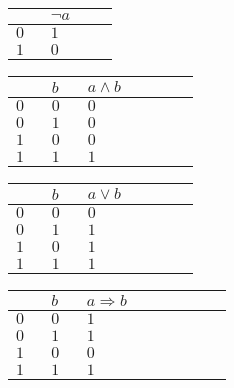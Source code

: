 \documentclass[12pt]{article}
\begin{document}
	\begin{center}
	\begin{longtable}{|>{\centering\arraybackslash}p{0.2333\linewidth}|>{\centering\arraybackslash}p{0.4666\linewidth}|}
		\hline
		{\small $a$} & {\small $\neg a$}\\ 
		\hline
		$0$ & $1$\\ 
		\hline
		$1$ & $0$\\ 
		\hline
	\end{longtable}\end{center}
	\begin{center}
	\begin{longtable}{|>{\centering\arraybackslash}p{0.1399\linewidth}|>{\centering\arraybackslash}p{0.1399\linewidth}|>{\centering\arraybackslash}p{0.4199\linewidth}|}
		\hline
		{\small $a$} & {\small $b$} & {\small $a\wedge b$}\\ 
		\hline
		$0$ & $0$ & $0$\\ 
		\hline
		$0$ & $1$ & $0$\\ 
		\hline
		$1$ & $0$ & $0$\\ 
		\hline
		$1$ & $1$ & $1$\\ 
		\hline
	\end{longtable}\end{center}
	\begin{center}
	\begin{longtable}{|>{\centering\arraybackslash}p{0.1399\linewidth}|>{\centering\arraybackslash}p{0.1399\linewidth}|>{\centering\arraybackslash}p{0.4199\linewidth}|}
		\hline
		{\small $a$} & {\small $b$} & {\small $a\vee b$}\\ 
		\hline
		$0$ & $0$ & $0$\\ 
		\hline
		$0$ & $1$ & $1$\\ 
		\hline
		$1$ & $0$ & $1$\\ 
		\hline
		$1$ & $1$ & $1$\\ 
		\hline
	\end{longtable}\end{center}
	\begin{center}
	\begin{longtable}{|>{\centering\arraybackslash}p{0.1166\linewidth}|>{\centering\arraybackslash}p{0.1166\linewidth}|>{\centering\arraybackslash}p{0.4666\linewidth}|}
		\hline
		{\small $a$} & {\small $b$} & {\small $a\Rightarrow b$}\\ 
		\hline
		$0$ & $0$ & $1$\\ 
		\hline
		$0$ & $1$ & $1$\\ 
		\hline
		$1$ & $0$ & $0$\\ 
		\hline
		$1$ & $1$ & $1$\\ 
		\hline
	\end{longtable}\end{center}
\end{document}

